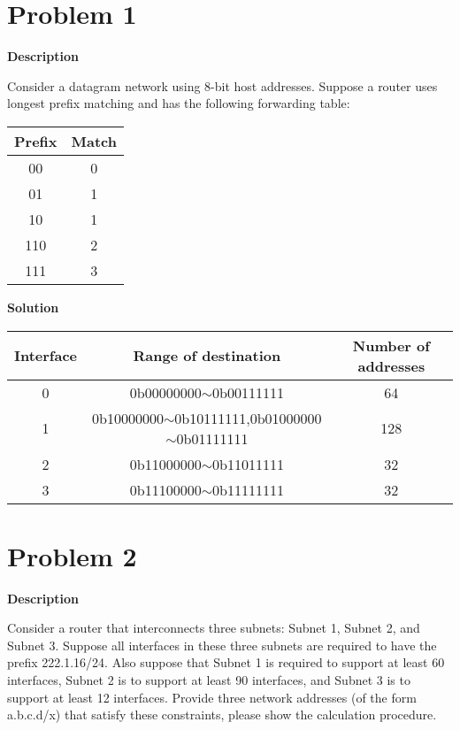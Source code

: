 \documentclass[12pt,letterpaper]{ctexart}
\begin{document}
\section*{Problem 1}

{\bf Description}

Consider a datagram network using 8-bit host addresses. Suppose a router uses longest prefix matching and has the following forwarding table:

\begin{table}[htbp]
  \small
  \centering
  \begin{tabular}{|c|c|}
  \hline
  Prefix & Match \\ \hline
  00     & 0     \\ \hline
  01     & 1     \\ \hline
  10     & 1     \\ \hline
  110    & 2     \\ \hline
  111    & 3     \\ \hline
  \end{tabular}
\end{table}
{\bf Solution}

\begin{table}[htbp]
  \small
  \centering
  \begin{tabular}{|c|c|c|}
  \hline
  Interface & Range of destination                                  & Number of addresses  \\ \hline
  0         & 0b00000000$\sim$0b00111111                            & 64    \\ \hline
  1         & 0b10000000$\sim$0b10111111,0b01000000$\sim$0b01111111 & 128   \\ \hline
  2         & 0b11000000$\sim$0b11011111                            & 32    \\ \hline
  3         & 0b11100000$\sim$0b11111111                            & 32    \\ \hline
  \end{tabular}
\end{table}

\newpage

\section*{Problem 2}

{\bf Description}

Consider a router that interconnects three subnets: Subnet 1, Subnet 2, and Subnet 3.
Suppose all interfaces in these three subnets are required to have the prefix 222.1.16/24. Also
suppose that Subnet 1 is required to support at least 60 interfaces, Subnet 2 is to support at least
90 interfaces, and Subnet 3 is to support at least 12 interfaces. Provide three network addresses
(of the form a.b.c.d/x) that satisfy these constraints, please show the calculation procedure.
\end{document}
